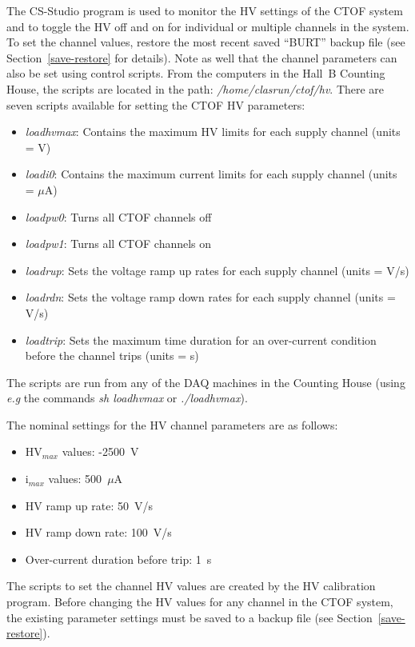 \documentclass[12pt]{article}
\begin{document}
The CS-Studio program is used to monitor the HV settings of the CTOF system and to toggle the HV off and on
for individual or multiple channels in the system. To set the channel values, restore the most recent saved
``BURT'' backup file (see Section~\ref{save-restore} for details). Note as well that the channel parameters
can also be set using control scripts. From the computers in the Hall~B Counting House, the scripts are
located in the path: {\it /home/clasrun/ctof/hv}. There are seven scripts available for setting the CTOF HV
parameters:

\begin{itemize}
\item {\it loadhvmax}: Contains the maximum HV limits for each supply channel (units = V)
\item {\it loadi0}: Contains the maximum current limits for each supply channel (units = $\mu$A)
\item {\it loadpw0}: Turns all CTOF channels off
\item {\it loadpw1}: Turns all CTOF channels on
\item {\it loadrup}: Sets the voltage ramp up rates for each supply channel (units = V/s)
\item {\it loadrdn}: Sets the voltage ramp down rates for each supply channel (units = V/s)
\item {\it loadtrip}: Sets the maximum time duration for an over-current condition before the channel trips
(units = s)
\end{itemize}

The scripts are run from any of the DAQ machines in the Counting House (using {\it e.g} the commands
{\it sh loadhvmax} or {\it ./loadhvmax}).

The nominal settings for the HV channel parameters are as follows:

\begin{itemize}
\item HV$_{max}$ values: -2500~V
\item i$_{max}$ values: 500~$\mu$A
\item HV ramp up rate: 50~V/s
\item HV ramp down rate: 100~V/s
\item Over-current duration before trip: 1~s
\end{itemize}

The scripts to set the channel HV values are created by the HV calibration program. Before changing the HV
values for any channel in the CTOF system, the existing parameter settings must be saved to a backup file
(see Section~\ref{save-restore}).
\end{document}
